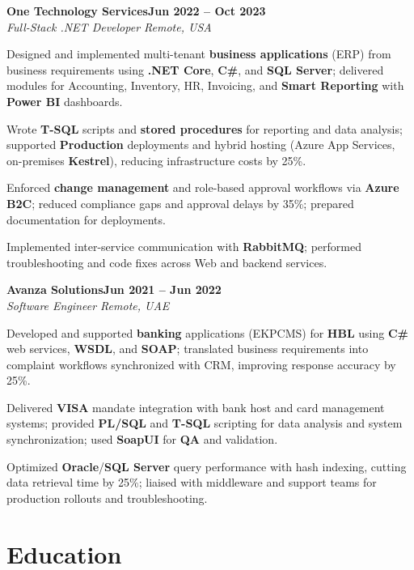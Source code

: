 \documentclass[letterpaper,10pt]{article}
\newcommand{\headingBf}[2]{
  \hspace{10pt}\textbf{#1}\hfill\textbf{#2}\\
}
\newcommand{\headingIt}[2]{
  \hspace{10pt}\textit{#1}\hfill\textit{#2}\\
}
\newenvironment{resume_list}{
  \vspace{-7pt}
  \begin{itemize}[itemsep=-2px, parsep=1pt, leftmargin=30pt]
}{
  \end{itemize}
}
\begin{document}
\headingBf{One Technology Services}{Jun 2022 -- Oct 2023}
\headingIt{Full-Stack .NET Developer \hfill Remote, USA}{}
\begin{resume_list}
    \item Designed and implemented multi-tenant \textbf{business applications} (ERP) from business requirements using \textbf{.NET Core}, \textbf{C\#}, and \textbf{SQL Server}; delivered modules for Accounting, Inventory, HR, Invoicing, and \textbf{Smart Reporting} with \textbf{Power BI} dashboards.
    \item Wrote \textbf{T-SQL} scripts and \textbf{stored procedures} for reporting and data analysis; supported \textbf{Production} deployments and hybrid hosting (Azure App Services, on-premises \textbf{Kestrel}), reducing infrastructure costs by 25\%.
    \item Enforced \textbf{change management} and role-based approval workflows via \textbf{Azure B2C}; reduced compliance gaps and approval delays by 35\%; prepared documentation for deployments.
    \item Implemented inter-service communication with \textbf{RabbitMQ}; performed troubleshooting and code fixes across Web and backend services.
\end{resume_list}

\headingBf{Avanza Solutions}{Jun 2021 -- Jun 2022}
\headingIt{Software Engineer \hfill Remote, UAE}{}
\begin{resume_list}
    \item Developed and supported \textbf{banking} applications (EKPCMS) for \textbf{HBL} using \textbf{C\#} web services, \textbf{WSDL}, and \textbf{SOAP}; translated business requirements into complaint workflows synchronized with CRM, improving response accuracy by 25\%.
    \item Delivered \textbf{VISA} mandate integration with bank host and card management systems; provided \textbf{PL/SQL} and \textbf{T-SQL} scripting for data analysis and system synchronization; used \textbf{SoapUI} for \textbf{QA} and validation.
    \item Optimized \textbf{Oracle}/\textbf{SQL Server} query performance with hash indexing, cutting data retrieval time by 25\%; liaised with middleware and support teams for production rollouts and troubleshooting.
\end{resume_list}

\section{Education}
\end{document}
